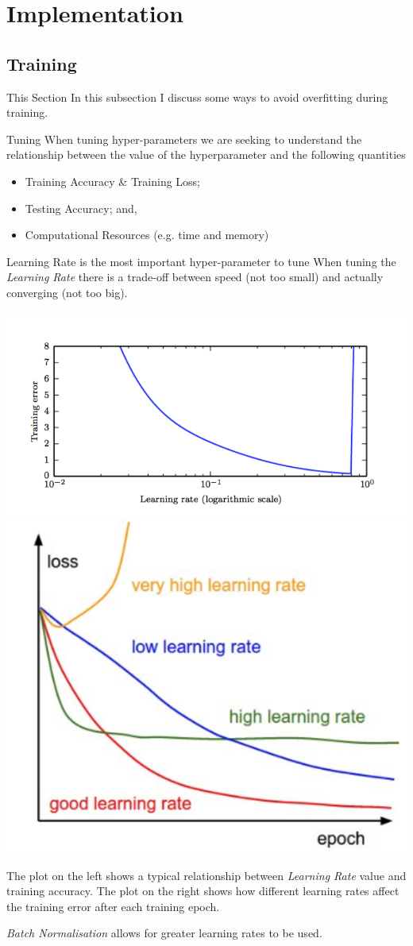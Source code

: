 \documentclass[11pt,a4paper]{article}
\begin{document}
\section{Implementation}

\subsection{Training}

  \begin{remark}{This Section}
    In this subsection I discuss some ways to avoid overfitting during training.
  \end{remark}

  \begin{remark}{Tuning}
    When tuning hyper-parameters we are seeking to understand the relationship between the value of the hyperparameter and the following quantities
    \begin{itemize}
      \item Training Accuracy \& Training Loss;
      \item Testing Accuracy; and,
      \item Computational Resources (e.g. time and memory)
    \end{itemize}
  \end{remark}

  \begin{remark}{Learning Rate is the most important hyper-parameter to tune}
    When tuning the \textit{Learning Rate} there is a trade-off between speed (not too small) and actually converging (not too big).
    \begin{center}
      \includegraphics[width=.35\textwidth]{LearningRate.PNG}
      \includegraphics[width=.35\textwidth]{DifferentLearningRates.PNG}
    \end{center}
    The plot on the left shows a typical relationship between \textit{Learning Rate} value and training accuracy. The plot on the right shows how different learning rates affect the training error after each training epoch.
    \par \textit{Batch Normalisation} allows for greater learning rates to be used.
  \end{remark}
\end{document}
